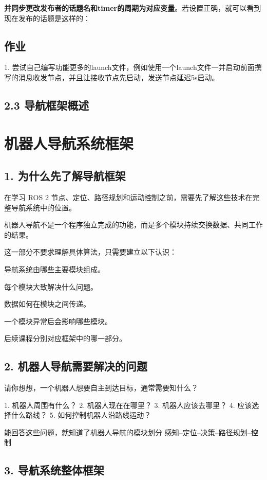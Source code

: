 \documentclass[a4paper,12pt]{book}
\begin{document}
{\textbf{并同步更改发布者的话题名和timer的周期为对应变量}。若设置正确，就可以看到现在发布的话题是这样的：


\section{作业}
1. 尝试自己编写功能更多的launch文件，例如使用一个launch文件一并启动前面撰写的消息收发节点，并且让接收节点先启动，发送节点延迟5s启动。
\section{2.3 导航框架概述}

\chapter{机器人导航系统框架}

\section{1. 为什么先了解导航框架}

在学习 ROS 2 节点、定位、路径规划和运动控制之前，需要先了解这些技术在完整导航系统中的位置。

机器人导航不是一个程序独立完成的功能，而是多个模块持续交换数据、共同工作的结果。

这一部分不要求理解具体算法，只需要建立以下认识：

\item 导航系统由哪些主要模块组成。
\item 每个模块大致解决什么问题。
\item 数据如何在模块之间传递。
\item 一个模块异常后会影响哪些模块。
\item 后续课程分别对应框架中的哪一部分。

\section{2. 机器人导航需要解决的问题}

请你想想，一个机器人想要自主到达目标，通常需要知什么？

1. 机器人周围有什么？
2. 机器人现在在哪里？
3. 机器人应该去哪里？
4. 应该选择什么路线？
5. 如何控制机器人沿路线运动？

能回答这些问题，就知道了机器人导航的模块划分
感知--定位--决策--路径规划--控制
\section{3. 导航系统整体框架}

}
\end{document}
